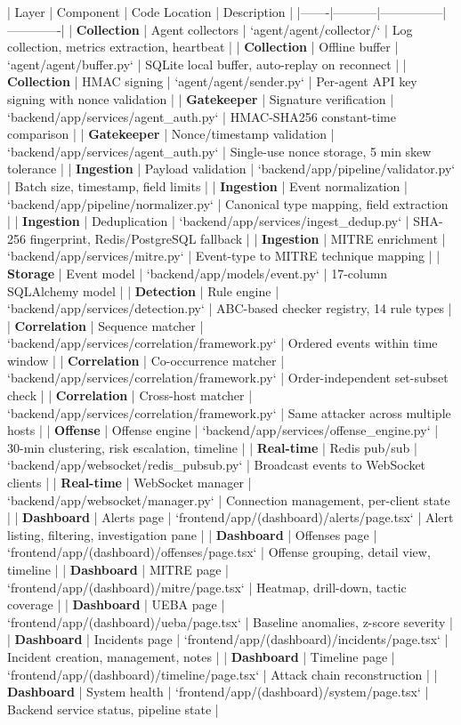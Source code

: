 | Layer | Component | Code Location | Description |
|-------|-----------|---------------|-------------|
| \textbf{Collection} | Agent collectors | `agent/agent/collector/` | Log collection, metrics extraction, heartbeat |
| \textbf{Collection} | Offline buffer | `agent/agent/buffer.py` | SQLite local buffer, auto-replay on reconnect |
| \textbf{Collection} | HMAC signing | `agent/agent/sender.py` | Per-agent API key signing with nonce validation |
| \textbf{Gatekeeper} | Signature verification | `backend/app/services/agent_auth.py` | HMAC-SHA256 constant-time comparison |
| \textbf{Gatekeeper} | Nonce/timestamp validation | `backend/app/services/agent_auth.py` | Single-use nonce storage, 5 min skew tolerance |
| \textbf{Ingestion} | Payload validation | `backend/app/pipeline/validator.py` | Batch size, timestamp, field limits |
| \textbf{Ingestion} | Event normalization | `backend/app/pipeline/normalizer.py` | Canonical type mapping, field extraction |
| \textbf{Ingestion} | Deduplication | `backend/app/services/ingest_dedup.py` | SHA-256 fingerprint, Redis/PostgreSQL fallback |
| \textbf{Ingestion} | MITRE enrichment | `backend/app/services/mitre.py` | Event-type to MITRE technique mapping |
| \textbf{Storage} | Event model | `backend/app/models/event.py` | 17-column SQLAlchemy model |
| \textbf{Detection} | Rule engine | `backend/app/services/detection.py` | ABC-based checker registry, 14 rule types |
| \textbf{Correlation} | Sequence matcher | `backend/app/services/correlation/framework.py` | Ordered events within time window |
| \textbf{Correlation} | Co-occurrence matcher | `backend/app/services/correlation/framework.py` | Order-independent set-subset check |
| \textbf{Correlation} | Cross-host matcher | `backend/app/services/correlation/framework.py` | Same attacker across multiple hosts |
| \textbf{Offense} | Offense engine | `backend/app/services/offense_engine.py` | 30-min clustering, risk escalation, timeline |
| \hline
\textbf{Real-time} | Redis pub/sub | `backend/app/websocket/redis_pubsub.py` | Broadcast events to WebSocket clients |
| \textbf{Real-time} | WebSocket manager | `backend/app/websocket/manager.py` | Connection management, per-client state |
| \hline
\textbf{Dashboard} | Alerts page | `frontend/app/(dashboard)/alerts/page.tsx` | Alert listing, filtering, investigation pane |
| \textbf{Dashboard} | Offenses page | `frontend/app/(dashboard)/offenses/page.tsx` | Offense grouping, detail view, timeline |
| \textbf{Dashboard} | MITRE page | `frontend/app/(dashboard)/mitre/page.tsx` | Heatmap, drill-down, tactic coverage |
| \textbf{Dashboard} | UEBA page | `frontend/app/(dashboard)/ueba/page.tsx` | Baseline anomalies, z-score severity |
| \textbf{Dashboard} | Incidents page | `frontend/app/(dashboard)/incidents/page.tsx` | Incident creation, management, notes |
| \textbf{Dashboard} | Timeline page | `frontend/app/(dashboard)/timeline/page.tsx` | Attack chain reconstruction |
| \textbf{Dashboard} | System health | `frontend/app/(dashboard)/system/page.tsx` | Backend service status, pipeline state |

